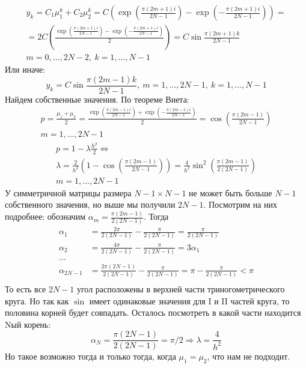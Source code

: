 \documentclass[12pt]{article}
\begin{document}
\begin{enumerate}
\begin{enumerate}
\begin{multline*}
            y_k=C_1\mu_1^k+C_2\mu_2^k=C\left(\exp\left(\frac{\pi(2m+1)i}{2N-1}\right)-\exp\left(-\frac{\pi(2m+1)i}{2N-1}\right)\right)=\\
            =2C\left(\frac{\exp\left(\frac{\pi(2m+1)i}{2N-1}\right)-\exp\left(-\frac{\pi(2m+1)i}{2N-1}\right)}{2}\right) = C\sin\frac{\pi(2m+1)k}{2N-1}\\
            m=0,...,2N-2,\ k=1,...,N-1
        \end{multline*}
        Или иначе:
        \[y_k=C\sin\frac{\pi(2m-1)k}{2N-1},\ m=1,...,2N-1,\ k=1,...,N-1\]
        Найдем собственные значения. По теореме Виета:
        \begin{multline*}
            p=\frac{\mu_1+\mu_2}{2}=\frac{\exp\left(\frac{\pi(2m-1)i}{2N-1}\right) + \exp\left(-\frac{\pi(2m-1)i}{2N-1}\right)}{2}=\cos\left(\frac{\pi(2m-1)}{2N-1}\right)\\
            m=1,...,2N-1
        \end{multline*}
        \begin{multline*}
            p=1-\lambda\frac{h^2}{2}\Leftrightarrow\\\lambda=\frac{2}{h^2}\left(1-\cos\left(\frac{\pi(2m-1)}{2N-1}\right)\right)=\frac{4}{h^2}\sin^2\left(\frac{\pi(2m-1)}{2(2N-1)}\right)\\
            m=1,...,2N-1
        \end{multline*}
        У симметричной матрицы размера $N-1\times N-1$ не может быть больше $N-1$ собственного значения, но выше мы получили $2N-1$.
        Посмотрим на них подробнее: обозначим $\alpha_m=\frac{\pi(2m-1)}{2(2N-1)}$. Тогда
        \begin{align*}
            \alpha_1 &= \frac{2\pi}{2(2N-1)} - \frac{\pi}{2(2N-1)} = \frac{\pi}{2(2N-1)} \\
            \alpha_2 &= \frac{4\pi}{2(2N-1)} - \frac{\pi}{2(2N-1)} = 3\alpha_1 \\
            ...& \\
            \alpha_{2N-1} &= \frac{2\pi(2N-1)}{2(2N-1)} - \frac{\pi}{2(2N-1)} = \pi - \frac{\pi}{2(2N-1)} < \pi \\
        \end{align*}
        То есть все $2N-1$ угол расположены в верхней части триногометрического круга.
        Но так как $\sin$ имеет одинаковые значения для I и II частей круга,
        то половина корней будет совпадать. Осталось посмотреть в какой части находится Nый корень:
        \[\alpha_{N} = \frac{\pi(2N-1)}{2(2N-1)} = \pi/2 \Rightarrow \lambda = \frac{4}{h^2}\]
        Но такое возможно тогда и только тогда, когда $\mu_1 = \mu_2$, что нам не подходит.

\end{enumerate}
\end{enumerate}
\end{document}
